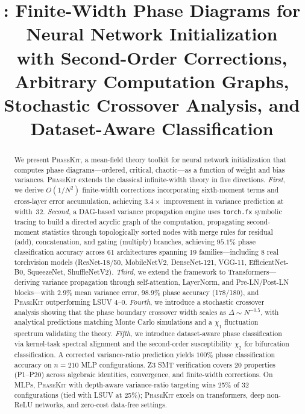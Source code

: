 \documentclass[10pt]{article}
\title{\ToolName{}: Finite-Width Phase Diagrams for Neural Network Initialization\\with Second-Order Corrections, Arbitrary Computation Graphs,\\Stochastic Crossover Analysis, and Dataset-Aware Classification}
\author{}
\date{}
\newcommand{\ToolName}{\textsc{PhaseKit}}
\begin{document}
\maketitle

\begin{abstract}
We present \ToolName{}, a mean-field theory toolkit for neural network initialization that computes phase diagrams---ordered, critical, chaotic---as a function of weight and bias variances.
\ToolName{} extends the classical infinite-width theory in five directions.
\emph{First}, we derive $O(1/N^2)$ finite-width corrections incorporating sixth-moment terms and cross-layer error accumulation, achieving $3.4\times$ improvement in variance prediction at width~32.
\emph{Second}, a DAG-based variance propagation engine uses \texttt{torch.fx} symbolic tracing to build a directed acyclic graph of the computation, propagating second-moment statistics through topologically sorted nodes with merge rules for residual (add), concatenation, and gating (multiply) branches, achieving $95.1\%$ phase classification accuracy across 61 architectures spanning 19 families---including 8 real torchvision models (ResNet-18/50, MobileNetV2, DenseNet-121, VGG-11, EfficientNet-B0, SqueezeNet, ShuffleNetV2).
\emph{Third}, we extend the framework to Transformers---deriving variance propagation through self-attention, LayerNorm, and Pre-LN/Post-LN blocks---with $2.9\%$ mean variance error, $98.9\%$ phase accuracy (178/180), and \ToolName{} outperforming LSUV $4$--$0$.
\emph{Fourth}, we introduce a stochastic crossover analysis showing that the phase boundary crossover width scales as $\Delta \sim N^{-0.5}$, with analytical predictions matching Monte Carlo simulations and a $\chi_1$ fluctuation spectrum validating the theory.
\emph{Fifth}, we introduce dataset-aware phase classification via kernel-task spectral alignment and the second-order susceptibility $\chi_2$ for bifurcation classification.
A corrected variance-ratio prediction yields $100\%$ phase classification accuracy on $n=210$ MLP configurations.
Z3 SMT verification covers 20 properties (P1--P20) across algebraic identities, convergence, and finite-width corrections.
On MLPs, \ToolName{} with depth-aware variance-ratio targeting wins 25\% of 32 configurations (tied with LSUV at 25\%); \ToolName{} excels on transformers, deep non-ReLU networks, and zero-cost data-free settings.
\end{abstract}
\end{document}
